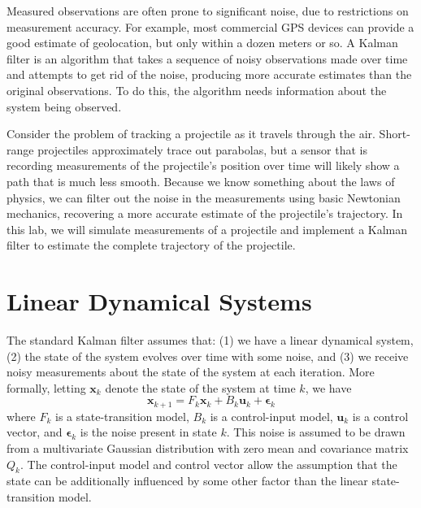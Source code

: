 
Measured observations are often prone to significant noise, due to restrictions on measurement accuracy.
For example, most commercial GPS devices can provide a good estimate of geolocation, but only within a dozen meters or so.
A Kalman filter is an algorithm that takes a sequence of noisy observations made over time and attempts to get rid of the noise,
producing more accurate estimates than the original observations.
To do this, the algorithm needs information about the system being observed.

Consider the problem of tracking a projectile as it travels through the air.
Short-range projectiles approximately trace out parabolas, but a sensor that is recording measurements of the projectile's position over time will likely show a path that is much
less smooth.
Because we know something about the laws of physics, we can filter out the noise in the measurements using basic Newtonian mechanics, recovering a more accurate estimate
of the projectile's trajectory.
In this lab, we will simulate measurements of a projectile and implement a Kalman filter to estimate the complete trajectory of the projectile.

\section*{Linear Dynamical Systems}
The standard Kalman filter assumes that:
(1) we have a linear dynamical system,
(2) the state of the system evolves over time with some noise, and
(3) we receive noisy measurements about the state of the system at each iteration.
More formally, letting $\mathbf{x}_{k}$ denote the state of the system at time $k$, we have
\begin{equation}
\mathbf{x}_{k+1} = F_{k} \mathbf{x}_{k} + B_{k}\mathbf{u}_{k} + \boldsymbol{\epsilon}_{k}
\label{eq:state}
\end{equation}
where $F_{k}$ is a state-transition model, $B_{k}$ is a control-input model, $\mathbf{u}_{k}$ is a control vector, and $\boldsymbol{\epsilon}_{k}$ is the noise present in state $k$.
This noise is assumed to be drawn from a multivariate Gaussian distribution with zero mean and covariance matrix $Q_{k}$.
The control-input model and control vector allow the assumption that the state can be additionally influenced by some other factor than the linear state-transition model.


